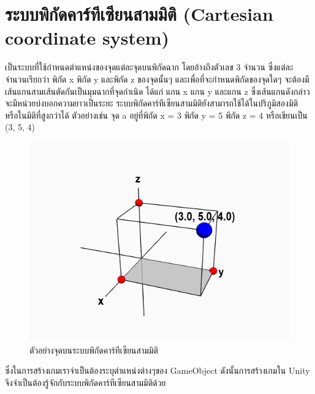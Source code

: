 \section{ระบบพิกัดคาร์ทีเซียนสามมิติ (Cartesian coordinate system)}
\enskip \enskip \enskip \enskip \enskip เป็นระบบที่ใช้กำหนดตำแหน่งของจุดแต่ละจุดบนพิกัดฉาก โดยอ้างถึงตัวเลข 3 จำนวน 
ซึ่งแต่ละจำนวนเรียกว่า พิกัด x พิกัด y และพิกัด z ของจุดนั้นๆ และเพื่อที่จะกำหนดพิกัดของจุดใดๆ จะต้องมีเส้นแกนสามเส้นตัดกันเป็นมุมฉากที่จุดกำเนิด
ได้แก่ แกน x แกน y และแกน z ซึ่งเส้นแกนดังกล่าวจะมีหน่วยบ่งบอกความยาวเป็นระยะ ระบบพิกัดคาร์ทีเซียนสามมิติยังสามารถใช้ได้ในปริภูมิสองมิติ 
หรือในมิติที่สูงกว่าได้ ตัวอย่างเช่น จุด a อยู่ที่พิกัด x = 3 พิกัด y = 5 พิกัด z = 4 หรือเขียนเป็น (3, 5, 4) 
\graphicspath{ {./images/} }

\begin{figure}[htbp]
  \centering 
  \includegraphics[scale=0.5]{cartesian coordinate 3d.png}
  \caption[Cartesian coordinate]{ตัวอย่างจุดบนระบบพิกัดคาร์ทีเซียนสามมิติ}
  \label{fig:cartesian}
\end{figure}
ซึ่งในการสร้างเกมเราจำเป็นต้องระบุตำแหน่งต่างๆของ GameObject ดังนั้นการสร้างเกมใน Unity จึงจำเป็นต้องรู้จักกับระบบพิกัดคาร์ทีเซียนสามมิติด้วย


